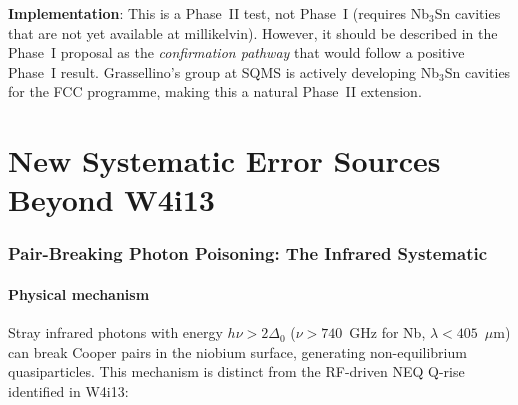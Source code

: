 \documentclass[11pt]{article}
\theoremstyle{definition}
\theoremstyle{remark}
\begin{document}
\begin{tcolorbox}[colback=blue!5!white, colframe=blue!60!black,
  title=\textbf{W4i14 TOP 5 FINDINGS --- Ranked by Programme Impact}]
\begin{enumerate}
\textbf{Implementation}: This is a Phase~II test, not Phase~I (requires
Nb$_3$Sn cavities that are not yet available at millikelvin). However,
it should be described in the Phase~I proposal as the \emph{confirmation
pathway} that would follow a positive Phase~I result. Grassellino's
group at SQMS is actively developing Nb$_3$Sn cavities for the FCC
programme, making this a natural Phase~II extension.

\end{enumerate}
\end{tcolorbox}


\part{New Systematic Error Sources Beyond W4i13}
\label{part:new_systematics}


\section{Pair-Breaking Photon Poisoning: The Infrared Systematic}
\label{sec:pbp}

\subsection{Physical mechanism}

Stray infrared photons with energy $h\nu > 2\Delta_0$ ($\nu > 740$~GHz
for Nb, $\lambda < 405$~$\mu$m) can break Cooper pairs in the niobium
surface, generating non-equilibrium quasiparticles. This mechanism is
distinct from the RF-driven NEQ Q-rise identified in W4i13:
\end{document}
